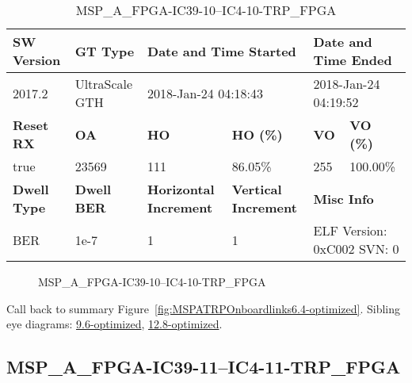\begin{table}[h]
\centering
\caption{MSP\_A\_FPGA-IC39-10--IC4-10-TRP\_FPGA}
\label{tab:MSPAFPGAIC3910IC410TRPFPGA6.4-optimized}
\begin{tabular}{@{}|l|l|l|l|l|l|@{}}
\toprule
\textbf{SW Version}                & \textbf{GT Type}   & \multicolumn{2}{l|}{\textbf{Date and Time Started}}            & \multicolumn{2}{l|}{\textbf{Date and Time Ended}}        \\ \midrule
2017.2                       & UltraScale GTH          & \multicolumn{2}{l|}{2018-Jan-24 04:18:43}                   & \multicolumn{2}{l|}{2018-Jan-24 04:19:52}               \\ \midrule
\textbf{Reset RX}                  & \textbf{OA} & \textbf{HO}   & \textbf{HO (\%)} & \textbf{VO} & \textbf{VO (\%)} \\ \midrule
true & 23569        & 111          & 86.05\%        & 255        & 100.00\%       \\ \midrule
\textbf{Dwell Type}                & \textbf{Dwell BER} & \textbf{Horizontal Increment} & \textbf{Vertical Increment}    & \multicolumn{2}{l|}{\textbf{Misc Info}}                  \\ \midrule
BER                            & 1e-7        & 1        & 1           & \multicolumn{2}{l|}{ELF Version: 0xC002 SVN: 0}                         \\ \bottomrule
\end{tabular}
\end{table}

\begin{figure}[h]
\caption{MSP\_A\_FPGA-IC39-10--IC4-10-TRP\_FPGA} \label{fig:MSPAFPGAIC3910IC410TRPFPGA6.4-optimized}
\end{figure}

Call back to summary Figure~\ref{fig:MSPATRPOnboardlinks6.4-optimized}.
Sibling eye diagrams: \hyperref[sec:MSPAFPGAIC3910IC410TRPFPGA9.6-optimized]{9.6-optimized}, \hyperref[sec:MSPAFPGAIC3910IC410TRPFPGA12.8-optimized]{12.8-optimized}.

\clearpage
\newpage


\subsection{MSP\_A\_FPGA-IC39-11--IC4-11-TRP\_FPGA}\label{sec:MSPAFPGAIC3911IC411TRPFPGA6.4-optimized}

